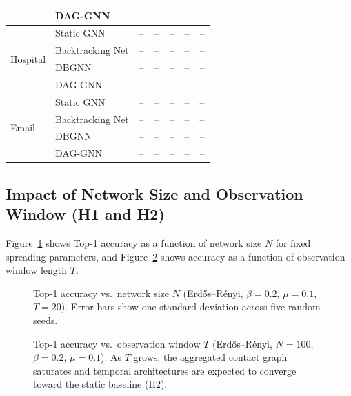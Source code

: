 \begin{table}[htbp]
\begin{tabular}{llccccc}
      & DAG-GNN           & -- & -- & -- & -- & -- \\
    \hline
    \multirow{4}{*}{Hospital}
      & Static GNN        & -- & -- & -- & -- & -- \\
      & Backtracking Net  & -- & -- & -- & -- & -- \\
      & DBGNN             & -- & -- & -- & -- & -- \\
      & DAG-GNN           & -- & -- & -- & -- & -- \\
    \hline
    \multirow{4}{*}{Email}
      & Static GNN        & -- & -- & -- & -- & -- \\
      & Backtracking Net  & -- & -- & -- & -- & -- \\
      & DBGNN             & -- & -- & -- & -- & -- \\
      & DAG-GNN           & -- & -- & -- & -- & -- \\
    \hline
  \end{tabular}
\end{table}


\subsection{Impact of Network Size and Observation Window (H1 and H2)}
\label{ssst:impact_network_density}

Figure~\ref{fig:vary_n} shows Top-1 accuracy as a function of network size $N$
for fixed spreading parameters, and Figure~\ref{fig:vary_T} shows accuracy as a
function of observation window length $T$.

\begin{figure}[htbp]
  \centering
  \caption{Top-1 accuracy vs.\ network size $N$ (Erd\H{o}s--R\'enyi,
           $\beta=0.2$, $\mu=0.1$, $T=20$). Error bars show one standard
           deviation across five random seeds.}
  \label{fig:vary_n}
\end{figure}

\begin{figure}[htbp]
  \centering
  \caption{Top-1 accuracy vs.\ observation window $T$ (Erd\H{o}s--R\'enyi,
           $N=100$, $\beta=0.2$, $\mu=0.1$). As $T$ grows, the aggregated
           contact graph saturates and temporal architectures are expected to
           converge toward the static baseline (H2).}
  \label{fig:vary_T}
\end{figure}

